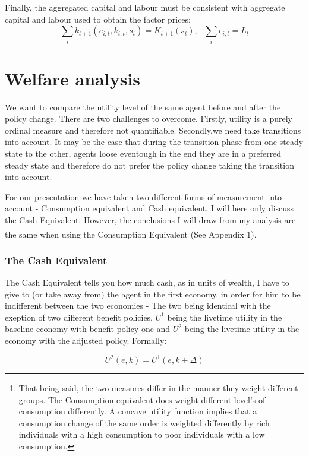 \documentclass[a4paper,12pt]{article}
\begin{document}
Finally, the aggregated capital and labour must be consistent with aggregate capital and labour used to obtain the factor prices: 
\[ \sum_{i}k_{t+1}(e_{i,t},k_{i,t},s_{t})=K_{t+1}(s_{t}), \ \ \ \sum_{i}e_{i,t}=L_{t} 
\]

\section{Welfare analysis}
We want to compare the utility level of the same agent before and after the policy change. There are two challenges to overcome. Firstly, utility is a purely ordinal measure and therefore not quantifiable. Secondly,we need take transitions into account. It may be the case that during the transition phase from one steady state to the other, agents loose eventough in the end they are in a preferred steady state and therefore do not prefer the policy change taking the transition into account. 

For our presentation we have taken two different forms of measurement into account - Consumption equivalent and Cash equivalent. I will here only discuss the Cash Equivalent. However, the conclusions I will draw from my analysis are the same when using the Consumption Equivalent (See Appendix 1).\footnote{That being said, the two measures differ in the manner they weight different groups. The Consumption equivalent does weight different level's of consumption differently. A concave utility function implies that a consumption change of the same order is weighted differently by rich individuals with a high consumption to poor individuals with a low consumption.} 

\subsubsection*{The Cash Equivalent}

The Cash Equivalent tells you how much cash, as in units of wealth, I have to give to (or take away from) the agent in the first economy, in order for him to be indifferent between the two economies - The two being identical with the exeption of two different benefit policies. $U^{1}$ being the livetime utility in the baseline economy with benefit policy one and $U^{2}$ being the livetime utility in the economy with the adjusted policy. Formally: 

  \begin{equation}
  U^{2}(e,k) = U^{1}(e,k+\Delta) \nonumber
  \end{equation}
\end{document}
